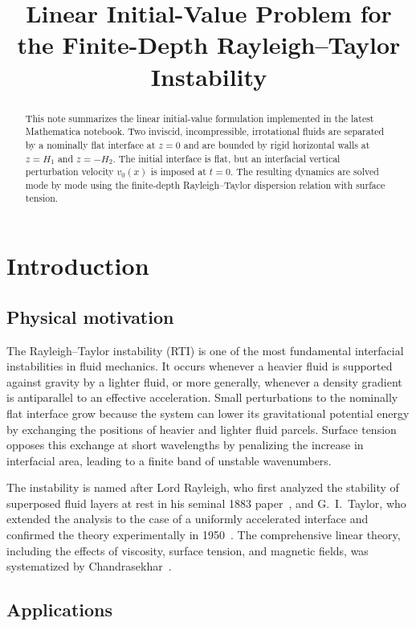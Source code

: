 \documentclass[11pt,a4paper]{article}
\title{Linear Initial-Value Problem for the Finite-Depth Rayleigh--Taylor Instability}
\author{}
\date{}
\begin{document}
\maketitle

\begin{abstract}
This note summarizes the linear initial-value formulation implemented in the latest Mathematica notebook.  Two inviscid, incompressible, irrotational fluids are separated by a nominally flat interface at $z=0$ and are bounded by rigid horizontal walls at $z=H_1$ and $z=-H_2$.  The initial interface is flat, but an interfacial vertical perturbation velocity $v_0(x)$ is imposed at $t=0$.  The resulting dynamics are solved mode by mode using the finite-depth Rayleigh--Taylor dispersion relation with surface tension.
\end{abstract}

\section{Introduction}

\subsection{Physical motivation}

The Rayleigh--Taylor instability (RTI) is one of the most fundamental interfacial instabilities in fluid mechanics.  It occurs whenever a heavier fluid is supported against gravity by a lighter fluid, or more generally, whenever a density gradient is antiparallel to an effective acceleration.  Small perturbations to the nominally flat interface grow because the system can lower its gravitational potential energy by exchanging the positions of heavier and lighter fluid parcels.  Surface tension opposes this exchange at short wavelengths by penalizing the increase in interfacial area, leading to a finite band of unstable wavenumbers.

The instability is named after Lord Rayleigh, who first analyzed the stability of superposed fluid layers at rest in his seminal 1883 paper~\cite{rayleigh1883}, and G.~I.~Taylor, who extended the analysis to the case of a uniformly accelerated interface and confirmed the theory experimentally in 1950~\cite{taylor1950}.  The comprehensive linear theory, including the effects of viscosity, surface tension, and magnetic fields, was systematized by Chandrasekhar~\cite{chandrasekhar1961}.

\subsection{Applications}
\end{document}
